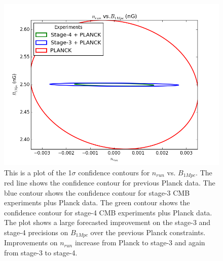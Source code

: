 \begin{figure}[h]
\centering
\includegraphics[scale=0.85]{images/contours/nrun.png}
\caption{This is a plot of the 1$\sigma$ confidence contours for $n_{run}$ vs. $B_{1Mpc}$. The red line shows the confidence contour for previous Planck data. The blue contour shows the confidence contour for stage-3 CMB experiments plus Planck data. The green contour shows the confidence contour for stage-4 CMB experiments plus Planck data. The plot shows a large forecasted improvement on the stage-3 and stage-4 precisions on $B_{1Mpc}$ over the previous Planck constraints. Improvements on $n_{run}$ increase from Planck to stage-3 and again from stage-3 to stage-4.}
\label{fig:nrun}
\end{figure}

